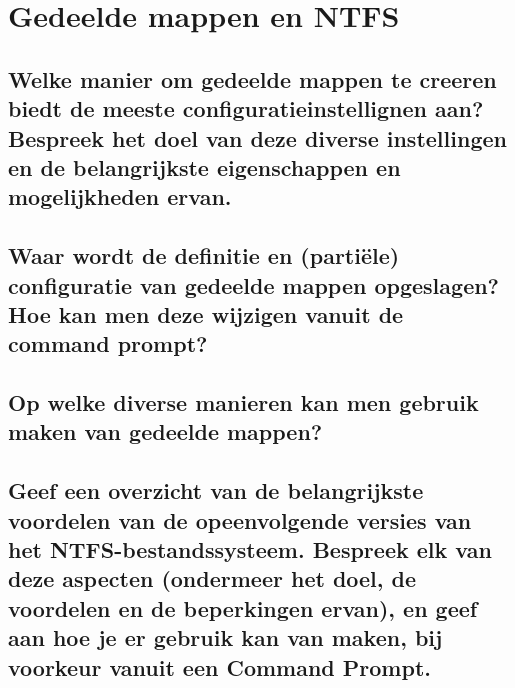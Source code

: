 \chapter{Gedeelde mappen en NTFS}

\section{Welke manier om gedeelde mappen te creeren biedt de meeste
configuratieinstellignen aan? Bespreek het doel van deze diverse instellingen en
de belangrijkste eigenschappen en mogelijkheden ervan.}

\section{Waar wordt de definitie en (partiële) configuratie van gedeelde mappen
opgeslagen? Hoe kan men deze wijzigen vanuit de command prompt?}

\section{Op welke diverse manieren kan men gebruik maken van gedeelde mappen?}

\section{Geef een overzicht van de belangrijkste voordelen van de opeenvolgende
versies van het NTFS-bestandssysteem. Bespreek elk van deze aspecten (ondermeer
het doel, de voordelen en de beperkingen ervan), en geef aan hoe je er gebruik
kan van maken, bij voorkeur vanuit een Command Prompt.}
